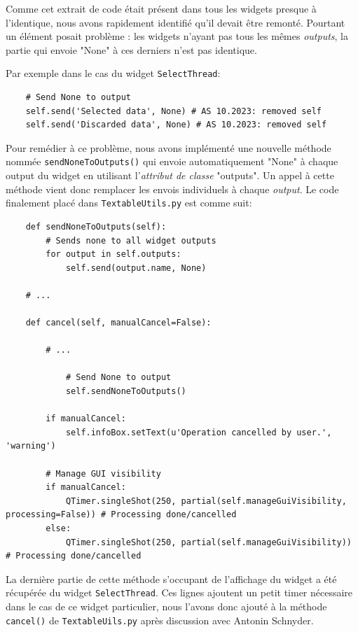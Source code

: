 \documentclass{article}
\begin{document}
Comme cet extrait de code était présent dans tous les widgets presque à l'identique, nous avons rapidement identifié qu'il devait être remonté. Pourtant un élément posait problème : les widgets n'ayant pas tous les mêmes \textit{outputs}, la partie qui envoie "None" à ces derniers n'est pas identique.

Par exemple dans le cas du widget \texttt{SelectThread}:

\begin{verbatim}
    # Send None to output 
    self.send('Selected data', None) # AS 10.2023: removed self
    self.send('Discarded data', None) # AS 10.2023: removed self
\end{verbatim}

Pour remédier à ce problème, nous avons implémenté une nouvelle méthode nommée \texttt{sendNoneToOutputs()} qui envoie automatiquement "None" à chaque output du widget en utilisant l'\textit{attribut de classe} "outputs". Un appel à cette méthode vient donc remplacer les envois individuels à chaque \textit{output}. Le code finalement placé dans \texttt{TextableUtils.py} est comme suit:

\begin{verbatim}
    def sendNoneToOutputs(self):
        # Sends none to all widget outputs
        for output in self.outputs:
            self.send(output.name, None)

    # ...

    def cancel(self, manualCancel=False):

        # ...
            
            # Send None to output
            self.sendNoneToOutputs()
            
        if manualCancel:
            self.infoBox.setText(u'Operation cancelled by user.', 'warning')
            
        # Manage GUI visibility
        if manualCancel:
            QTimer.singleShot(250, partial(self.manageGuiVisibility, processing=False)) # Processing done/cancelled
        else:
            QTimer.singleShot(250, partial(self.manageGuiVisibility)) # Processing done/cancelled
\end{verbatim}

La dernière partie de cette méthode s'occupant de l'affichage du widget a été récupérée du widget \texttt{SelectThread}. Ces lignes ajoutent un petit timer nécessaire dans le cas de ce widget particulier, nous l'avons donc ajouté à la méthode \texttt{cancel()} de \texttt{TextableUils.py} après discussion avec Antonin Schnyder.
\end{document}

